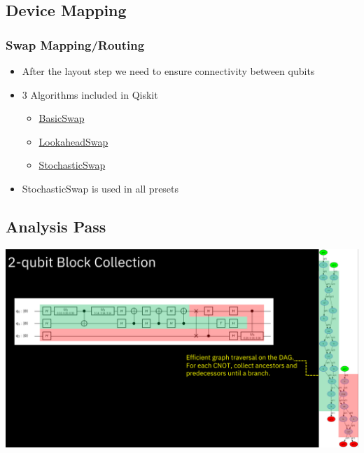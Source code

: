 \documentclass[aspectratio=169,11pt,hyperref={colorlinks=true}]{beamer}
\begin{document}
\subsection{Device Mapping}
\begin{frame}
    \frametitle{Swap Mapping/Routing}
            \begin{itemize}
                \item After the layout step we need to ensure connectivity between qubits
                \item 3 Algorithms included in Qiskit
                    \begin{itemize}
                        \item \href{https://github.com/Qiskit/qiskit-terra/blob/master/qiskit/transpiler/passes/routing/basic_swap.py}{BasicSwap}
                        \item \href{https://github.com/Qiskit/qiskit-terra/blob/master/qiskit/transpiler/passes/routing/lookahead_swap.py}{LookaheadSwap}
                        \item \href{https://github.com/Qiskit/qiskit-terra/blob/master/qiskit/transpiler/passes/routing/stochastic_swap.py}{StochasticSwap}
                    \end{itemize}
                \item StochasticSwap is used in all presets
            \end{itemize}
\end{frame}

\subsection{Analysis Pass}
{
\begin{frame}
    \includegraphics[width=\textwidth]{block_collection.png}
\end{frame}
}
\end{document}
